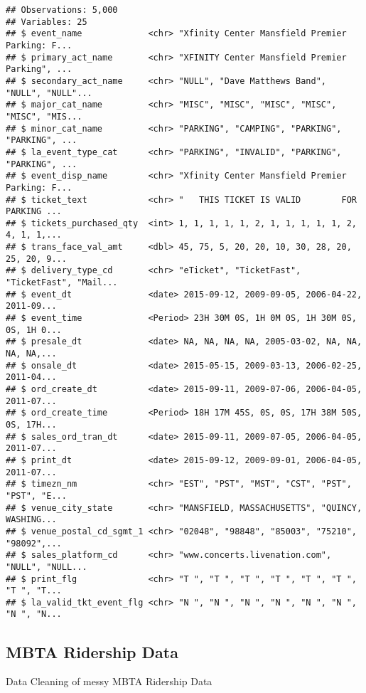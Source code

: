 \documentclass[]{article}
\begin{document}
\begin{verbatim}
## Observations: 5,000
## Variables: 25
## $ event_name             <chr> "Xfinity Center Mansfield Premier Parking: F...
## $ primary_act_name       <chr> "XFINITY Center Mansfield Premier Parking", ...
## $ secondary_act_name     <chr> "NULL", "Dave Matthews Band", "NULL", "NULL"...
## $ major_cat_name         <chr> "MISC", "MISC", "MISC", "MISC", "MISC", "MIS...
## $ minor_cat_name         <chr> "PARKING", "CAMPING", "PARKING", "PARKING", ...
## $ la_event_type_cat      <chr> "PARKING", "INVALID", "PARKING", "PARKING", ...
## $ event_disp_name        <chr> "Xfinity Center Mansfield Premier Parking: F...
## $ ticket_text            <chr> "   THIS TICKET IS VALID        FOR PARKING ...
## $ tickets_purchased_qty  <int> 1, 1, 1, 1, 1, 2, 1, 1, 1, 1, 1, 2, 4, 1, 1,...
## $ trans_face_val_amt     <dbl> 45, 75, 5, 20, 20, 10, 30, 28, 20, 25, 20, 9...
## $ delivery_type_cd       <chr> "eTicket", "TicketFast", "TicketFast", "Mail...
## $ event_dt               <date> 2015-09-12, 2009-09-05, 2006-04-22, 2011-09...
## $ event_time             <Period> 23H 30M 0S, 1H 0M 0S, 1H 30M 0S, 0S, 1H 0...
## $ presale_dt             <date> NA, NA, NA, NA, 2005-03-02, NA, NA, NA, NA,...
## $ onsale_dt              <date> 2015-05-15, 2009-03-13, 2006-02-25, 2011-04...
## $ ord_create_dt          <date> 2015-09-11, 2009-07-06, 2006-04-05, 2011-07...
## $ ord_create_time        <Period> 18H 17M 45S, 0S, 0S, 17H 38M 50S, 0S, 17H...
## $ sales_ord_tran_dt      <date> 2015-09-11, 2009-07-05, 2006-04-05, 2011-07...
## $ print_dt               <date> 2015-09-12, 2009-09-01, 2006-04-05, 2011-07...
## $ timezn_nm              <chr> "EST", "PST", "MST", "CST", "PST", "PST", "E...
## $ venue_city_state       <chr> "MANSFIELD, MASSACHUSETTS", "QUINCY, WASHING...
## $ venue_postal_cd_sgmt_1 <chr> "02048", "98848", "85003", "75210", "98092",...
## $ sales_platform_cd      <chr> "www.concerts.livenation.com", "NULL", "NULL...
## $ print_flg              <chr> "T ", "T ", "T ", "T ", "T ", "T ", "T ", "T...
## $ la_valid_tkt_event_flg <chr> "N ", "N ", "N ", "N ", "N ", "N ", "N ", "N...
\end{verbatim}

\hypertarget{mbta-ridership-data}{%
\subsection{MBTA Ridership Data}\label{mbta-ridership-data}}

Data Cleaning of messy MBTA Ridership Data
\end{document}
